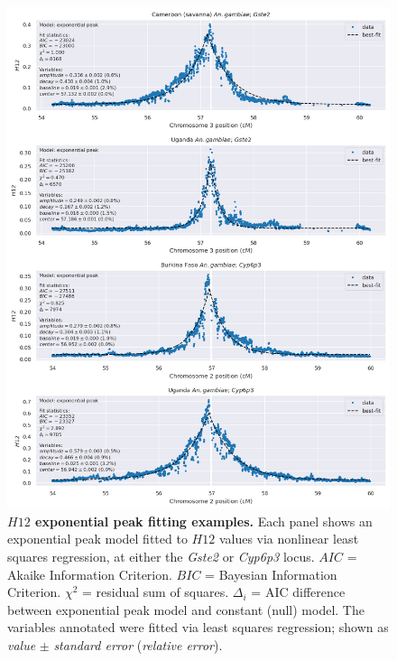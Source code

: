 \documentclass[a4paper,11pt,abstracton,hidelinks]{scrartcl}
\begin{document}
\begin{figure}[t!]
	\begin{center}
		\includegraphics*[width=1\linewidth,center]{artwork/exponential_fit_examples.png}
	\end{center}
	\caption[$H12$ exponential peak fitting examples]{
	\textbf{$H12$ exponential peak fitting examples.}
	Each panel shows an exponential peak model fitted to $H12$ values via nonlinear least squares regression, at either the \textit{Gste2} or \textit{Cyp6p3} locus.
	$AIC$ = Akaike Information Criterion.
	$BIC$ = Bayesian Information Criterion.
	$\chi^{2}$ = residual sum of squares.
	$\Delta_{i}$ = AIC difference between exponential peak model and constant (null) model.
	The variables annotated were fitted via least squares regression; shown as \textit{value} $\pm$ \textit{standard error} (\textit{relative error}).
	} 
	\label{fig:exponential_fit_examples}
\end{figure}
\end{document}
